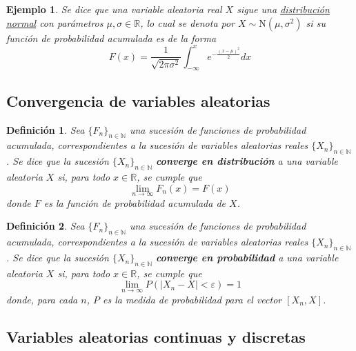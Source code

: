 \documentclass[12pt,letterpaper,draft]{book}
\newtheorem{definicion}{Definición}[chapter]
\newtheorem{ejemplo}{Ejemplo}[chapter]
\newcommand{\R}{\mathbb{R}}
\newcommand{\N}{\mathbb{N}}
\newcommand{\abso}[1]{\left| #1 \right|}
\begin{document}
\begin{ejemplo}
Se dice que una variable aleatoria real $X$ sigue una \ul{distribuci\'on normal} con parámetros $\mu, \sigma \in \R$, lo cual se denota por $X\sim \text{N}(\mu,\sigma^{2})$ si su función de probabilidad acumulada es de la forma
\begin{equation}
F(x) = \frac{1}{\sqrt{2 \pi \sigma^{2}}} \int_{-\infty}^{x} e^{-\frac{(x-\mu)^{2}}{2}} dx
\end{equation}
\end{ejemplo}


\subsection{Convergencia de variables aleatorias}

\begin{definicion}
Sea $\{ F_n \}_{n\in \N}$ una sucesión de funciones de probabilidad acumulada, correspondientes a la sucesión de variables aleatorias reales $\{ X_n \}_{n\in \N}$. Se dice que la sucesión $\{ X_n \}_{n\in \N}$ \textbf{converge en distribución} a una variable aleatoria $X$ si, para todo $x\in \R$, se cumple que
\begin{equation}
\lim_{n\rightarrow\infty} F_n(x) = F(x)
\end{equation}
donde $F$ es la función de probabilidad acumulada de $X$.
\end{definicion}

\begin{definicion}
Sea $\{ F_n \}_{n\in \N}$ una sucesión de funciones de probabilidad acumulada, correspondientes a la sucesión de variables aleatorias reales $\{ X_n \}_{n\in \N}$. Se dice que la sucesión $\{ X_n \}_{n\in \N}$ \textbf{converge en probabilidad} a una variable aleatoria $X$ si, para todo $x\in \R$, se cumple que
\begin{equation}
\lim_{n\rightarrow\infty} P\left( \abso{X_n-X} < \varepsilon \right) = 1
\end{equation}
donde, para cada $n$, $P$ es la medida de probabilidad para el vector $[X_n, X]$.
\end{definicion}


\subsection{Variables aleatorias continuas y discretas}
\end{document}
